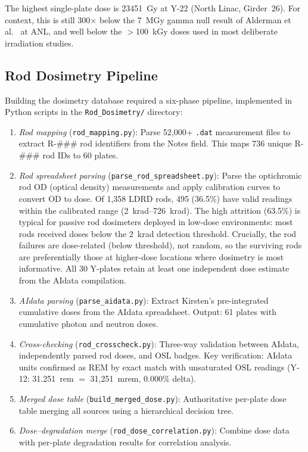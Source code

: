 \documentclass[11pt,letterpaper]{article}
\begin{document}
The highest single-plate dose is \SI{23451}{Gy} at Y-22 (North Linac,
Girder~26). For context, this is still 300$\times$ below the
\SI{7}{MGy} gamma null result of Alderman et al.~\cite{Alderman} at ANL, and well below the
$>$\SI{100}{kGy} doses used in most deliberate irradiation studies.

\subsection{Rod Dosimetry Pipeline}

Building the dosimetry database required a six-phase pipeline, implemented in
Python scripts in the \texttt{Rod\_Dosimetry/} directory:

\begin{enumerate}
    \item \emph{Rod mapping} (\texttt{rod\_mapping.py}): Parse 52,000+
    \texttt{.dat} measurement files to extract R-\#\#\# rod identifiers from
    the Notes field. This maps 736 unique R-\#\#\# rod IDs to 60 plates.

    \item \emph{Rod spreadsheet parsing} (\texttt{parse\_rod\_spreadsheet.py}):
    Parse the optichromic rod OD (optical density) measurements and apply
    calibration curves to convert OD to dose. Of 1,358 LDRD rods, 495 (36.5\%)
    have valid readings within the calibrated range (\SIrange{2}{726}{krad}).
    The high attrition (63.5\%) is typical for passive rod dosimeters deployed in
    low-dose environments: most rods received doses below the \SI{2}{krad}
    detection threshold. Crucially, the rod failures are dose-related
    (below threshold), not random, so the surviving rods are preferentially those
    at higher-dose locations where dosimetry is most informative. All 30 Y-plates
    retain at least one independent dose estimate from the AIdata compilation.

    \item \emph{AIdata parsing} (\texttt{parse\_aidata.py}): Extract Kirsten's
    pre-integrated cumulative doses from the AIdata spreadsheet. Output: 61
    plates with cumulative photon and neutron doses.

    \item \emph{Cross-checking} (\texttt{rod\_crosscheck.py}): Three-way
    validation between AIdata, independently parsed rod doses, and OSL badges.
    Key verification: AIdata units confirmed as REM by exact match with
    unsaturated OSL readings (Y-12: 31.251~rem $=$ 31,251~mrem, 0.000\% delta).

    \item \emph{Merged dose table} (\texttt{build\_merged\_dose.py}):
    Authoritative per-plate dose table merging all sources using a hierarchical
    decision tree.

    \item \emph{Dose--degradation merge} (\texttt{rod\_dose\_correlation.py}):
    Combine dose data with per-plate degradation results for correlation
    analysis.
\end{enumerate}
\end{document}
